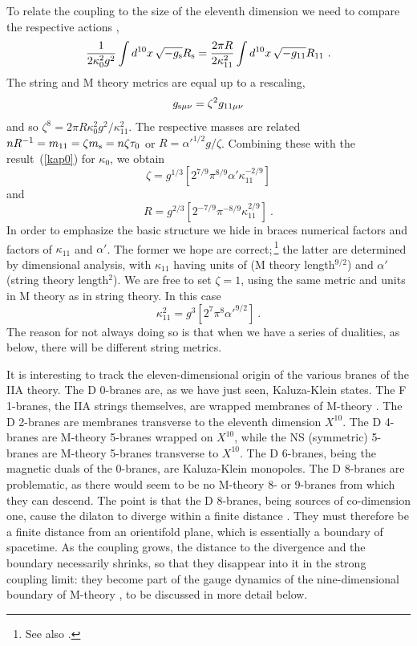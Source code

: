 \documentclass[12pt]{article}
\def\be{\begin{equation}}
\def\ee{\end{equation}}
\def\ap{\alpha'}
\begin{document}
To relate the coupling to the size of the eleventh dimension we need to
compare the respective actions \cite{wit},
\be
\frac{1}{2\kappa_0^2 g^2} \int d^{10} x\, \sqrt{-g_{\rm s}} R_{\rm s}
= \frac{2\pi R}{2\kappa_{11}^2} \int d^{10} x\, \sqrt{-g_{11}} R_{11}\ .
\ee
The string and M theory metrics are equal up to a rescaling,
\be
g_{{\rm s}\mu\nu} = \zeta^2 g_{{\rm 11}\mu\nu}  \label{mmet}
\ee
and so $\zeta^8 = 2\pi R \kappa_0^2 g^2 / \kappa_{11}^2$.
The respective masses are related $nR^{-1} = m_{11}
= \zeta m_{\rm s} = n \zeta \tau_0$ or
$R = \ap^{1/2} g/\zeta$.  Combining these with the result~(\ref{kap0}) for
$\kappa_0$, we obtain 
\be
\zeta = g^{1/3} \left[2^{7/9} \pi^{8/9} \ap \kappa_{11}^{-2/9}
\right]
\ee
and 
\be
R = g^{2/3} \left[2^{-7/9} \pi^{-8/9} \kappa_{11}^{2/9} \right]\ .  \label{mrad}
\ee
In order to emphasize the basic structure we
hide in braces numerical factors and factors of
$\kappa_{11}$ and $\ap$.  The former we hope are correct;\,\footnote
{See also \cite{shanta}.} the
latter are determined by dimensional analysis, with $\kappa_{11}$ having
units of (M theory length$^{9/2}$) and $\ap$ (string theory length$^2$). 
We are free to set $\zeta = 1$, using the same metric and units in M theory as
in string theory.  In this case
\be
\kappa_{11}^2 = g^3 \left[2^7 \pi^8 \ap^{9/2} \right]\ .
\ee
The reason for not always doing so is that when we have a series of dualities,
as below, there will be different string metrics.

It is interesting to track the eleven-dimensional origin of the various
branes of the IIA theory.  The D 0-branes are, as we have just seen,
Kaluza-Klein states. The F 1-branes, the IIA strings themselves, are
wrapped membranes of M-theory \cite{supmem}.  The D 2-branes are membranes
transverse to the eleventh dimension $X^{10}$.  The D 4-branes are M-theory
5-branes wrapped on $X^{10}$, while the NS (symmetric) 5-branes are
M-theory 5-branes transverse to $X^{10}$.  The D 6-branes, being the
magnetic duals of the 0-branes, are Kaluza-Klein monopoles.  The
D 8-branes are problematic, as there would seem to be no M-theory 8- or
9-branes from which they can descend.  The point is that the D 8-branes,
being sources of co-dimension one, cause the dilaton to diverge within a
finite distance \cite{polwit}.  They must therefore be a finite distance from
an orientifold plane, which is essentially a boundary of spacetime.  As
the coupling grows, the distance to the divergence and the boundary
necessarily shrinks, so that they disappear into it in the strong coupling
limit: they become part of the gauge dynamics of the nine-dimensional
boundary of M-theory \cite{horwit}, to be discussed in more detail below.
\end{document}
